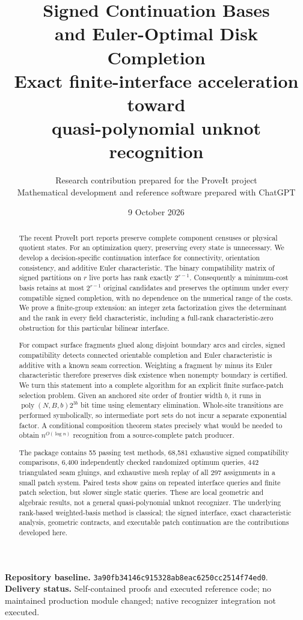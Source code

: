 \documentclass[11pt,letterpaper]{article}
\title{\vspace{-1em}\textbf{Signed Continuation Bases\\and Euler-Optimal Disk Completion}\\[0.65em]
\large Exact finite-interface acceleration toward\\quasi-polynomial unknot recognition}
\author{Research contribution prepared for the ProveIt project\\
\small Mathematical development and reference software prepared with ChatGPT}
\date{9 October 2026}
\theoremstyle{definition}
\newcommand{\poly}{\operatorname{poly}}
\newcommand{\pin}{\texttt{3a90fb34146c915328ab8eac6250cc2514f74ed0}}
\begin{document}
\maketitle
\begin{abstract}
The recent ProveIt port reports preserve complete component censuses or physical quotient states. For an optimization query, preserving every state is unnecessary. We develop a decision-specific continuation interface for connectivity, orientation consistency, and additive Euler characteristic. The binary compatibility matrix of signed partitions on $r$ live ports has rank exactly $2^{r-1}$. Consequently a minimum-cost basis retains at most $2^{r-1}$ original candidates and preserves the optimum under every compatible signed completion, with no dependence on the numerical range of the costs. We prove a finite-group extension: an integer zeta factorization gives the determinant and the rank in every field characteristic, including a full-rank characteristic-zero obstruction for this particular bilinear interface.

For compact surface fragments glued along disjoint boundary arcs and circles, signed compatibility detects connected orientable completion and Euler characteristic is additive with a known seam correction. Weighting a fragment by minus its Euler characteristic therefore preserves disk existence when nonempty boundary is certified. We turn this statement into a complete algorithm for an explicit finite surface-patch selection problem. Given an anchored site order of frontier width $b$, it runs in $\poly(N,B,b)2^{3b}$ bit time using elementary elimination. Whole-site transitions are performed symbolically, so intermediate port sets do not incur a separate exponential factor. A conditional composition theorem states precisely what would be needed to obtain $n^{O(\log n)}$ recognition from a source-complete patch producer.

The package contains 55 passing test methods, 68,581 exhaustive signed compatibility comparisons, 6,400 independently checked randomized optimum queries, 442 triangulated seam gluings, and exhaustive mesh replay of all 297 assignments in a small patch system. Paired tests show gains on repeated interface queries and finite patch selection, but slower single static queries. These are local geometric and algebraic results, not a general quasi-polynomial unknot recognizer. The underlying rank-based weighted-basis method is classical; the signed interface, exact characteristic analysis, geometric contracts, and executable patch continuation are the contributions developed here.
\end{abstract}
\vfill
\noindent\small\textbf{Repository baseline.} \pin.\\
\textbf{Delivery status.} Self-contained proofs and executed reference code; no maintained production module changed; native recognizer integration not executed.
\thispagestyle{empty}\clearpage
\normalsize
\begingroup\small
\tableofcontents
\endgroup
\clearpage
\end{document}

